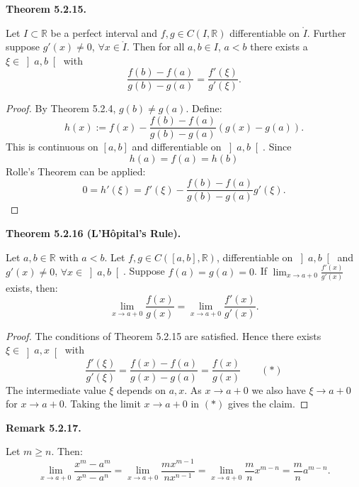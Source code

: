 \documentclass[12pt]{article}
\newenvironment{satz}[1]{%
  \par\vspace{6pt}\noindent\textbf{Theorem #1.}\itshape\space
}{%
  \par\vspace{6pt}
}
\newenvironment{bemerkung}[1]{%
  \par\vspace{6pt}\noindent\textbf{Remark #1.}\itshape\space
}{%
  \par\vspace{6pt}
}
\begin{document}
\begin{satz}{5.2.15}
Let $I \subset \mathbb{R}$ be a perfect interval and $f, g \in C(I, \mathbb{R})$ differentiable on $\mathring{I}$. Further suppose $g'(x) \neq 0$, $\forall x \in \mathring{I}$. Then for all $a, b \in I$, $a < b$ there exists a $\xi \in \left]a,b\right[$ with
\[
    \frac{f(b)-f(a)}{g(b)-g(a)} = \frac{f'(\xi)}{g'(\xi)}.
\]
\end{satz}

\begin{proof}
By Theorem 5.2.4, $g(b) \neq g(a)$. Define:
\[
    h(x) := f(x) - \frac{f(b)-f(a)}{g(b)-g(a)}(g(x)-g(a)).
\]
This is continuous on $[a,b]$ and differentiable on $\left]a,b\right[$. Since
\[
    h(a) = f(a) = h(b)
\]
Rolle's Theorem can be applied:
\[
    0 = h'(\xi) = f'(\xi) - \frac{f(b)-f(a)}{g(b)-g(a)}g'(\xi).
\]
\end{proof}

\begin{satz}{5.2.16 (L'H\^{o}pital's Rule)}
Let $a, b \in \mathbb{R}$ with $a < b$. Let $f, g \in C([a,b], \mathbb{R})$, differentiable on $\left]a,b\right[$ and $g'(x) \neq 0$, $\forall x \in \left]a,b\right[$. Suppose $f(a) = g(a) = 0$. If $\lim_{x \to a+0} \frac{f'(x)}{g'(x)}$ exists, then:
\[
    \lim_{x \to a+0} \frac{f(x)}{g(x)} = \lim_{x \to a+0} \frac{f'(x)}{g'(x)}.
\]
\end{satz}

\begin{proof}
The conditions of Theorem 5.2.15 are satisfied. Hence there exists $\xi \in \left]a,x\right[$ with
\[
    \frac{f'(\xi)}{g'(\xi)} = \frac{f(x)-f(a)}{g(x)-g(a)} = \frac{f(x)}{g(x)} \qquad (*)
\]
The intermediate value $\xi$ depends on $a, x$. As $x \to a+0$ we also have $\xi \to a+0$ for $x \to a+0$. Taking the limit $x \to a+0$ in $(*)$ gives the claim.
\end{proof}

\begin{bemerkung}{5.2.17}
Let $m \geq n$. Then:
\[
    \lim_{x \to a+0} \frac{x^m - a^m}{x^n - a^n}
    = \lim_{x \to a+0} \frac{mx^{m-1}}{nx^{n-1}}
    = \lim_{x \to a+0} \frac{m}{n}x^{m-n}
    = \frac{m}{n}a^{m-n}.
\]
\end{bemerkung}
\end{document}
